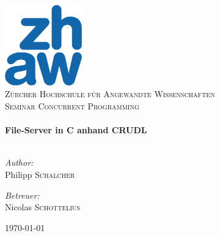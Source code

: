 \begin{titlepage}
\begin{center}
\includegraphics[width=0.25\textwidth]{img/zhaw.png}\\[0.5cm]
\textsc{\Large Zürcher Hochschule für Angewandte Wissenschaften}\\[1.0cm]
\textsc{\Large Seminar Concurrent Programming}\\[1.5cm]

\hrulefill \\[0.5cm]
{\huge \bfseries File-Server in C anhand CRUDL}\\[0.4cm]
\hrulefill \\[0.5cm]
\begin{minipage}{0.4\textwidth}
\begin{flushleft}
\emph{Author:}\\
Philipp \textsc{Schalcher}
\end{flushleft}
\end{minipage}
\begin{minipage}{0.4\textwidth}
\begin{flushright}
\emph{Betreuer:}\\
Nicolas \textsc{Schottelius}
\end{flushright}
\end{minipage}

\vfill

{\large \today}

\end{center}
\end{titlepage}